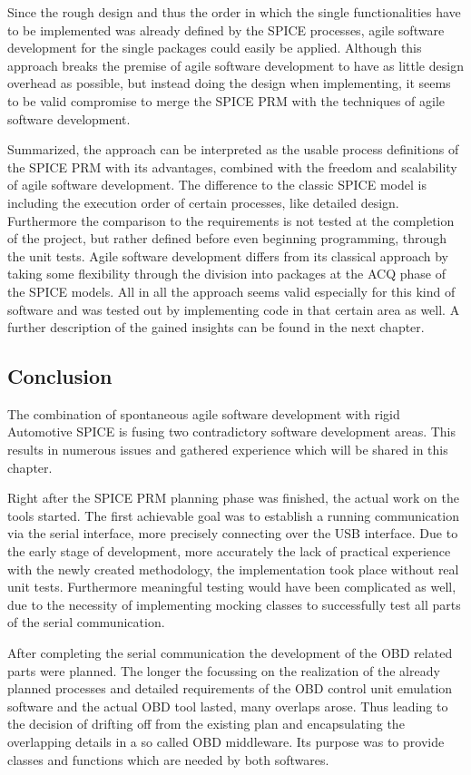 Since the rough design and thus the order in which the single functionalities have to be implemented was already defined by the SPICE processes,
agile software development for the single packages could easily be applied. Although this approach breaks the premise of agile software 
development to have as little design overhead as possible, but instead doing the design when implementing, it seems to be valid compromise to 
merge the SPICE PRM with the techniques of agile software development. 

Summarized, the approach can be interpreted as the usable process definitions of the SPICE PRM with its advantages, combined with the freedom 
and scalability of agile software development. The difference to the classic SPICE model is including the execution order of certain processes, 
like detailed design. Furthermore the comparison to the requirements is not tested at the completion of the project, but rather defined before 
even beginning programming, through the unit tests. Agile software development differs from its classical approach by taking some flexibility 
through the division into packages at the ACQ phase of the SPICE models. All in all the approach seems valid especially for this kind of 
software and was tested out by implementing code in that certain area as well. A further description of the gained insights can be found in the 
next chapter. 

\subsection{Conclusion}

The combination of spontaneous agile software development with rigid Automotive SPICE is fusing two contradictory software development areas. 
This results in numerous issues and gathered experience which will be shared in this chapter.

Right after the SPICE PRM planning phase was finished, the actual work on the tools started. The first achievable goal was to establish a 
running communication via the serial interface, more precisely connecting over the USB interface. Due to the early stage of development, more 
accurately the lack of practical experience with the newly created methodology, the implementation took place without real unit tests. 
Furthermore meaningful testing would have been complicated as well, due to the necessity of implementing mocking classes to successfully test 
all parts of the serial communication.

After completing the serial communication the development of the OBD related parts were planned. The longer the focussing on the realization of 
the already planned processes and detailed requirements of the OBD control unit emulation software and the actual OBD tool lasted, many overlaps 
arose. Thus leading to the decision of drifting off from the existing plan and encapsulating the overlapping details in a so called OBD 
middleware. Its purpose was to provide classes and functions which are needed by both softwares.

